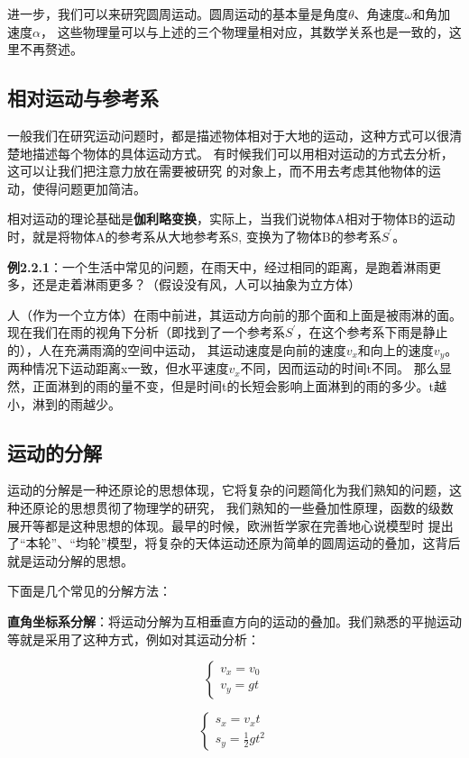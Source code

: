 \documentclass{article}
\begin{document}
    进一步，我们可以来研究圆周运动。圆周运动的基本量是角度\(\theta\)、角速度\(\omega\)和角加速度\(\alpha\)，
    这些物理量可以与上述的三个物理量相对应，其数学关系也是一致的，这里不再赘述。

\subsection{相对运动与参考系}
    一般我们在研究运动问题时，都是描述物体相对于大地的运动，这种方式可以很清楚地描述每个物体的具体运动方式。
    有时候我们可以用相对运动的方式去分析，这可以让我们把注意力放在需要被研究
    的对象上，而不用去考虑其他物体的运动，使得问题更加简洁。

    相对运动的理论基础是{\bfseries 伽利略变换}，实际上，当我们说物体A相对于物体B的运动时，就是将物体A的参考系从大地参考系S,
    变换为了物体B的参考系\(S^\prime\)。

    \textbf{例2.2.1}：一个生活中常见的问题，在雨天中，经过相同的距离，是跑着淋雨更多，还是走着淋雨更多？（假设没有风，人可以抽象为立方体）

    人（作为一个立方体）在雨中前进，其运动方向前的那个面和上面是被雨淋的面。现在我们在雨的视角下分析（即找到了一个参考系\(S^{\prime}\)，在这个参考系下雨是静止的），人在充满雨滴的空间中运动，
    其运动速度是向前的速度\(v_x\)和向上的速度\(v_y\)。两种情况下运动距离x一致，但水平速度\(v_x\)不同，因而运动的时间t不同。
    那么显然，正面淋到的雨的量不变，但是时间t的长短会影响上面淋到的雨的多少。t越小，淋到的雨越少。

\subsection{运动的分解}
    运动的分解是一种还原论的思想体现，它将复杂的问题简化为我们熟知的问题，这种还原论的思想贯彻了物理学的研究，
    我们熟知的一些叠加性原理，函数的级数展开等都是这种思想的体现。最早的时候，欧洲哲学家在完善地心说模型时
    提出了“本轮”、“均轮”模型，将复杂的天体运动还原为简单的圆周运动的叠加，这背后就是运动分解的思想。

    下面是几个常见的分解方法：

    \textbf{直角坐标系分解}：将运动分解为互相垂直方向的运动的叠加。我们熟悉的平抛运动等就是采用了这种方式，例如对其运动分析：

    \begin{minipage}{1\textwidth}
        \centering
        \begin{minipage}{0.2\textwidth}
            \centering
            \[
            \begin{cases}
                v_x = v_0 \\
                v_y = gt
            \end{cases}
            \]
        \end{minipage}
        \begin{minipage}{0.2\textwidth}
            \centering
            \[
            \begin{cases}
                s_x = v_x t \\
                s_y = \frac{1}{2} g t^2
            \end{cases}
            \]
        \end{minipage}
    \end{minipage}
    
\end{document}
